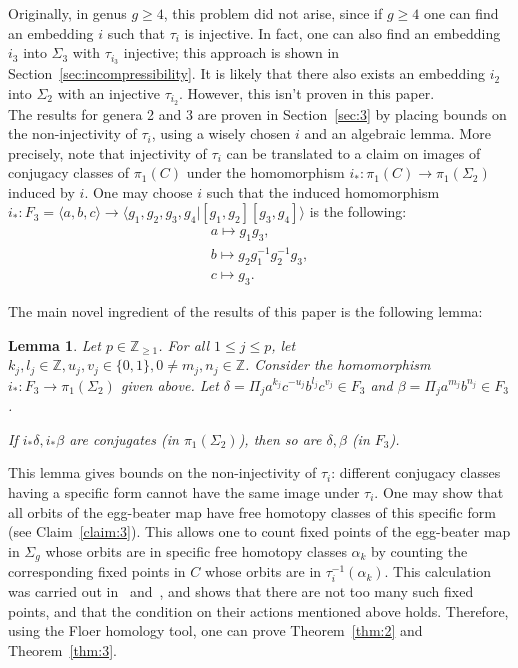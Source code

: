 \documentclass[11pt]{article}
\newenvironment{myequation}
    {
        \begin{equation*}
        \begin{gathered}
    }
    { 
        \end{gathered} 
        \end{equation*}
    }
\newtheorem{lemma}[theorem]{Lemma}
\newcommand{\Z}{\mathbb{Z}}
\begin{document}
        Originally, in genus $g \geq 4$, this problem did not arise, since if $g \geq 4$ one can find an embedding $i$ such that $\tau_i$ is injective. In fact, one can also find an embedding $i_3$ into $\Sigma_3$ with $\tau_{i_3}$ injective; this approach is shown in Section~\ref{sec:incompressibility}. It is likely that there also exists an embedding $i_2$ into $\Sigma_2$ with an injective $\tau_{i_2}$. However, this isn't proven in this paper. \\
        
        The results for genera 2 and 3 are proven in Section~\ref{sec:3} by placing bounds on the non-injectivity of $\tau_i$, using a wisely chosen $i$ and an algebraic lemma. More precisely, note that injectivity of $\tau_i$ can be translated to a claim on images of conjugacy classes of $\pi_1(C)$ under the homomorphism $i_*: \pi_1(C) \to \pi_1(\Sigma_2)$ induced by $i$. One may choose $i$ such that the induced homomorphism $i_*: F_3 = \langle a,b,c \rangle \to \langle g_1,g_2,g_3,g_4 | [g_1,g_2][g_3,g_4] \rangle$ is the following:
        \begin{myequation}
            a \mapsto g_1 g_3 ,\\
            b \mapsto g_2 g_1^{-1} g_2^{-1} g_3 ,\\
            c \mapsto g_3 .
        \end{myequation}
        
        The main novel ingredient of the results of this paper is the following lemma:
        
        \begin{lemma}
        \label{lemma:2}
            Let $p \in \Z_{\geq 1}$. For all $1 \leq j \leq p$, let $k_j,l_j \in \Z, u_j,v_j \in \{0,1\}, 0 \neq m_j,n_j \in \Z$. Consider the homomorphism $i_*: F_3 \to \pi_1(\Sigma_2)$ given above. Let $\delta = \Pi_j a^{k_j}c^{-u_j}b^{l_j}c^{v_j} \in F_3$ and $\beta = \Pi_j a^{m_j}b^{n_j} \in F_3$.
            
            If $i_* \delta, i_* \beta$ are conjugates (in $\pi_1(\Sigma_2)$), then so are $\delta, \beta$ (in $F_3$).
        \end{lemma}
        
        This lemma gives bounds on the non-injectivity of $\tau_i$: different conjugacy classes having a specific form cannot have the same image under $\tau_i$. One may show that all orbits of the egg-beater map have free homotopy classes of this specific form (see Claim~\ref{claim:3}). This allows one to count fixed points of the egg-beater map in $\Sigma_g$ whose orbits are in specific free homotopy classes $\alpha_k$ by counting the corresponding fixed points in $C$ whose orbits are in $\tau_i^{-1}(\alpha_k)$. This calculation was carried out in~\cite{PS14} and~\cite{10}, and shows that there are not too many such fixed points, and that the condition on their actions mentioned above holds. Therefore, using the Floer homology tool, one can prove Theorem~\ref{thm:2} and Theorem~\ref{thm:3}. \\
        
\end{document}

